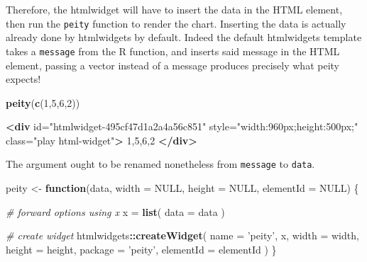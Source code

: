 \documentclass[10pt,]{krantz}
\makeatletter
\newenvironment{Shaded}{\begin{snugshade}}{\end{snugshade}}
\newcommand{\CommentTok}[1]{\textcolor[rgb]{0.37,0.37,0.37}{\textit{#1}}}
\newcommand{\ControlFlowTok}[1]{\textcolor[rgb]{0.27,0.27,0.27}{\textbf{#1}}}
\newcommand{\DataTypeTok}[1]{\textcolor[rgb]{0.27,0.27,0.27}{#1}}
\newcommand{\DecValTok}[1]{\textcolor[rgb]{0.06,0.06,0.06}{#1}}
\newcommand{\KeywordTok}[1]{\textcolor[rgb]{0.27,0.27,0.27}{\textbf{#1}}}
\newcommand{\NormalTok}[1]{#1}
\newcommand{\OperatorTok}[1]{\textcolor[rgb]{0.43,0.43,0.43}{\textbf{#1}}}
\newcommand{\OtherTok}[1]{\textcolor[rgb]{0.37,0.37,0.37}{#1}}
\newcommand{\StringTok}[1]{\textcolor[rgb]{0.5,0.5,0.5}{#1}}
\newenvironment{kframe}{%
\medskip{}
\setlength{\fboxsep}{.8em}
 \def\at@end@of@kframe{}%
 \ifinner\ifhmode%
  \def\at@end@of@kframe{\end{minipage}}%
  \begin{minipage}{\columnwidth}%
 \fi\fi%
 \def\FrameCommand##1{\hskip\@totalleftmargin \hskip-\fboxsep
 \colorbox{shadecolor}{##1}\hskip-\fboxsep
     \hskip-\linewidth \hskip-\@totalleftmargin \hskip\columnwidth}%
 \MakeFramed {\advance\hsize-\width
   \@totalleftmargin\z@ \linewidth\hsize
   \@setminipage}}%
 {\par\unskip\endMakeFramed%
 \at@end@of@kframe}
\renewenvironment{Shaded}{\begin{kframe}}{\end{kframe}}
\makeatother
\begin{document}
Therefore, the htmlwidget will have to insert the data in the HTML element, then run the \texttt{peity} function to render the chart. Inserting the data is actually already done by htmlwidgets by default. Indeed the default htmlwidgets template takes a \texttt{message} from the R function, and inserts said message in the HTML element, passing a vector instead of a message produces precisely what peity expects!

\begin{Shaded}
\begin{Highlighting}[]
\KeywordTok{peity}\NormalTok{(}\KeywordTok{c}\NormalTok{(}\DecValTok{1}\NormalTok{,}\DecValTok{5}\NormalTok{,}\DecValTok{6}\NormalTok{,}\DecValTok{2}\NormalTok{))}
\end{Highlighting}
\end{Shaded}

\begin{Shaded}
\begin{Highlighting}[]
\KeywordTok{<div} 
\OtherTok{  id=}\StringTok{"htmlwidget-495cf47d1a2a4a56c851"} 
\OtherTok{  style=}\StringTok{"width:960px;height:500px;"} 
\OtherTok{  class=}\StringTok{"play html-widget"}\KeywordTok{>}
\NormalTok{  1,5,6,2}
\KeywordTok{</div>}
\end{Highlighting}
\end{Shaded}

The argument ought to be renamed nonetheless from \texttt{message} to \texttt{data}.

\begin{Shaded}
\begin{Highlighting}[]
\NormalTok{peity <-}\StringTok{ }\ControlFlowTok{function}\NormalTok{(data, }\DataTypeTok{width =} \OtherTok{NULL}\NormalTok{, }\DataTypeTok{height =} \OtherTok{NULL}\NormalTok{, }
  \DataTypeTok{elementId =} \OtherTok{NULL}\NormalTok{) \{}

  \CommentTok{# forward options using x}
\NormalTok{  x =}\StringTok{ }\KeywordTok{list}\NormalTok{(}
    \DataTypeTok{data =}\NormalTok{ data}
\NormalTok{  )}

  \CommentTok{# create widget}
\NormalTok{  htmlwidgets}\OperatorTok{::}\KeywordTok{createWidget}\NormalTok{(}
    \DataTypeTok{name =} \StringTok{'peity'}\NormalTok{,}
\NormalTok{    x,}
    \DataTypeTok{width =}\NormalTok{ width,}
    \DataTypeTok{height =}\NormalTok{ height,}
    \DataTypeTok{package =} \StringTok{'peity'}\NormalTok{,}
    \DataTypeTok{elementId =}\NormalTok{ elementId}
\NormalTok{  )}
\NormalTok{\}}
\end{Highlighting}
\end{Shaded}
\end{document}
